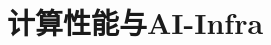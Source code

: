 \setcounter{chapter}{6}

\hypertarget{ux8ba1ux7b97ux6027ux80fdux4e0eai-infra}{%
\chapter{计算性能与AI-Infra}\label{ux8ba1ux7b97ux6027ux80fdux4e0eai-infra}}
